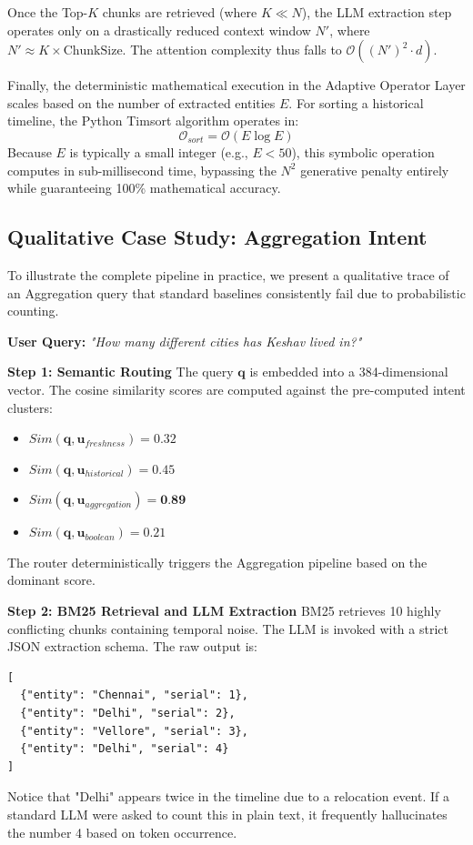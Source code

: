 \documentclass[journal,10pt]{IEEEtran}
\begin{document}
Once the Top-$K$ chunks are retrieved (where $K \ll N$), the LLM extraction step operates only on a drastically reduced context window $N'$, where $N' \approx K \times \text{ChunkSize}$. The attention complexity thus falls to $\mathcal{O}((N')^2 \cdot d)$.

Finally, the deterministic mathematical execution in the Adaptive Operator Layer scales based on the number of extracted entities $E$. For sorting a historical timeline, the Python Timsort algorithm operates in:
\begin{equation}
\mathcal{O}_{sort} = \mathcal{O}(E \log E)
\end{equation}
Because $E$ is typically a small integer (e.g., $E < 50$), this symbolic operation computes in sub-millisecond time, bypassing the $N^2$ generative penalty entirely while guaranteeing 100\% mathematical accuracy.

\subsection{Qualitative Case Study: Aggregation Intent}
To illustrate the complete pipeline in practice, we present a qualitative trace of an Aggregation query that standard baselines consistently fail due to probabilistic counting.

\textbf{User Query:} \textit{"How many different cities has Keshav lived in?"}

\textbf{Step 1: Semantic Routing} 
The query $\mathbf{q}$ is embedded into a 384-dimensional vector. The cosine similarity scores are computed against the pre-computed intent clusters:
\begin{itemize}
    \item $Sim(\mathbf{q}, \mathbf{u}_{freshness}) = 0.32$
    \item $Sim(\mathbf{q}, \mathbf{u}_{historical}) = 0.45$
    \item $Sim(\mathbf{q}, \mathbf{u}_{aggregation}) = \textbf{0.89}$
    \item $Sim(\mathbf{q}, \mathbf{u}_{boolean}) = 0.21$
\end{itemize}
The router deterministically triggers the Aggregation pipeline based on the dominant score.

\textbf{Step 2: BM25 Retrieval and LLM Extraction}
BM25 retrieves 10 highly conflicting chunks containing temporal noise. The LLM is invoked with a strict JSON extraction schema. The raw output is:
\begin{verbatim}
[
  {"entity": "Chennai", "serial": 1},
  {"entity": "Delhi", "serial": 2},
  {"entity": "Vellore", "serial": 3},
  {"entity": "Delhi", "serial": 4}
]
\end{verbatim}
Notice that "Delhi" appears twice in the timeline due to a relocation event. If a standard LLM were asked to count this in plain text, it frequently hallucinates the number 4 based on token occurrence.
\end{document}
